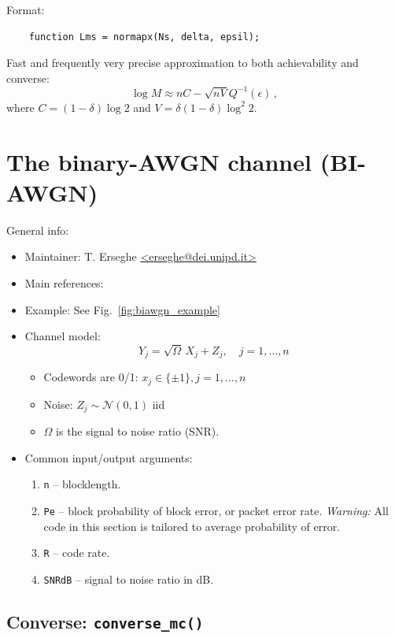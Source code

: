\documentclass[a4paper,11p]{memoir}
\def\matn{\mathcal{N}}
\begin{document}
Format:
\begin{verbatim}
	function Lms = normapx(Ns, delta, epsil);
\end{verbatim}

Fast and frequently very precise approximation to both achievability and converse:
	$$ \log M \approx n C - \sqrt{nV} Q^{-1}(\epsilon)\,, $$
where $C=(1-\delta)\log 2$ and $V=\delta(1-\delta)\log^2 2$.



\chapter{The binary-AWGN channel (BI-AWGN)}

General info:
\begin{itemize}
\item Maintainer: T. Erseghe \url{<erseghe@dei.unipd.it>}

\item Main references: \cite{erseghe2015coding}

\item Example: See Fig.~\ref{fig:biawgn_example} 

\item Channel model:
	$$ Y_j = \sqrt{\Omega} \,X_j + Z_j, \quad j=1,\ldots,n $$
	\begin{itemize}
	\item Codewords are 0/1: $x_j \in \{\pm1\}, j=1,\ldots,n$
	\item Noise: $Z_j \sim  \matn(0,1)$ iid
	\item $\Omega$ is the signal to noise ratio (SNR).\\
	\end{itemize}

\item Common input/output arguments:
\begin{enumerate}
\item \verb|n| -- blocklength.
\item \verb|Pe| -- block probability of block error, or packet error rate. \textit{Warning:} All code in this section is tailored to
average probability of error.
\item \verb|R| -- code rate. 
\item \verb|SNRdB| -- signal to noise ratio in dB.
\end{enumerate}
\end{itemize}

\section{Converse: \texttt{converse\_mc()}}
\end{document}
